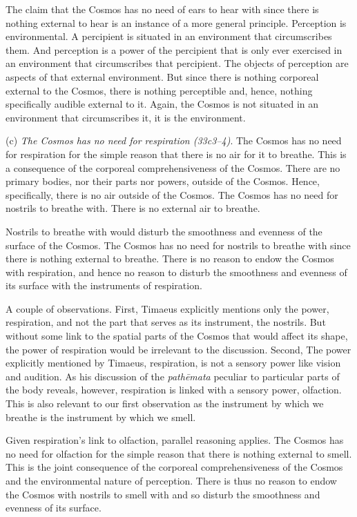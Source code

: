 The claim that the Cosmos has no need of ears to hear with since there is nothing external to hear is an instance of a more general principle. Perception is environmental. A percipient is situated in an environment that circumscribes them. And perception is a power of the percipient that is only ever exercised in an environment that circumscribes that percipient. The objects of perception are aspects of that external environment. But since there is nothing corporeal external to the Cosmos, there is nothing perceptible and, hence, nothing specifically audible external to it. Again, the Cosmos is not situated in an environment that circumscribes it, it is the environment.

(c) \emph{The Cosmos has no need for respiration (33c3--4)}. The Cosmos has no need for respiration for the simple reason that there is no air for it to breathe. This is a consequence of the corporeal comprehensiveness of the Cosmos. There are no primary bodies, nor their parts nor powers, outside of the Cosmos. Hence, specifically, there is no air outside of the Cosmos. The Cosmos has no need for nostrils to breathe with. There is no external air to breathe.

Nostrils to breathe with would disturb the smoothness and evenness of the surface of the Cosmos. The Cosmos has no need for nostrils to breathe with since there is nothing external to breathe. There is no reason to endow the Cosmos with respiration, and hence no reason to disturb the smoothness and evenness of its surface with the instruments of respiration.

A couple of observations. First, Timaeus explicitly mentions only the power, respiration, and not the part that serves as its instrument, the nostrils. But without some link to the spatial parts of the Cosmos that would affect its shape, the power of respiration would be irrelevant to the discussion. Second, The power explicitly mentioned by Timaeus, respiration, is not a sensory power like vision and audition. As his discussion of the \emph{pathēmata} peculiar to particular parts of the body reveals, however, respiration is linked with a sensory power, olfaction. This is also relevant to our first observation as the instrument by which we breathe is the instrument by which we smell.

Given respiration's link to olfaction, parallel reasoning applies. The Cosmos has no need for olfaction for the simple reason that there is nothing external to smell. This is the joint consequence of the corporeal comprehensiveness of the Cosmos and the environmental nature of perception. There is thus no reason to endow the Cosmos with nostrils to smell with and so disturb the smoothness and evenness of its surface.

